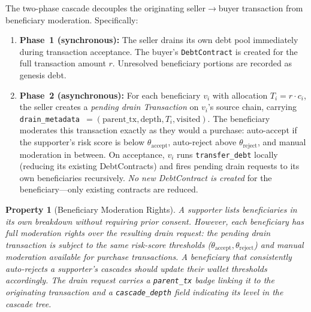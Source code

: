 \documentclass[11pt]{article}
\newtheorem{property}{Property}[section]
\begin{document}
The two-phase cascade decouples the originating seller$\to$buyer transaction from beneficiary moderation. Specifically:

\begin{enumerate}
    \item \textbf{Phase~1 (synchronous):} The seller drains its own debt pool immediately during transaction acceptance. The buyer's \texttt{DebtContract} is created for the full transaction amount $r$. Unresolved beneficiary portions are recorded as genesis debt.
    \item \textbf{Phase~2 (asynchronous):} For each beneficiary $v_i$ with allocation $T_i = r \cdot c_i$, the seller creates a \emph{pending drain Transaction} on $v_i$'s source chain, carrying \texttt{drain\_metadata}~$= (\text{parent\_tx}, \text{depth}, T_i, \text{visited})$. The beneficiary moderates this transaction exactly as they would a purchase: auto-accept if the supporter's risk score is below $\theta_{\text{accept}}$, auto-reject above $\theta_{\text{reject}}$, and manual moderation in between. On acceptance, $v_i$ runs \texttt{transfer\_debt} locally (reducing its existing DebtContracts) and fires pending drain requests to its own beneficiaries recursively. \emph{No new DebtContract is created} for the beneficiary---only existing contracts are reduced.
\end{enumerate}

\begin{property}[Beneficiary Moderation Rights]\label{prop:beneficiary_moderation}
A supporter lists beneficiaries in its own breakdown without requiring prior consent. However, each beneficiary has full moderation rights over the resulting drain request: the pending drain transaction is subject to the same risk-score thresholds ($\theta_{\text{accept}}, \theta_{\text{reject}}$) and manual moderation available for purchase transactions. A beneficiary that consistently auto-rejects a supporter's cascades should update their wallet thresholds accordingly. The drain request carries a \texttt{parent\_tx} badge linking it to the originating transaction and a \texttt{cascade\_depth} field indicating its level in the cascade tree.
\end{property}
\end{document}
